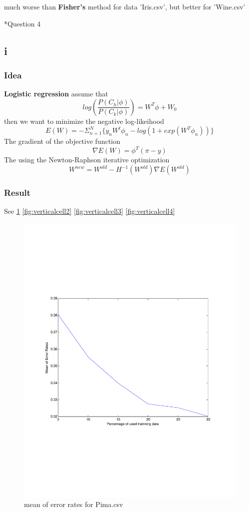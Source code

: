 \documentclass[12pt]{amsart}
\makeatletter
\renewcommand{\section}{\@startsection{section}{1}{0mm}
{-\baselineskip}{0.5\baselineskip}{\bf\leftline}}
\makeatother
\begin{document}
much worse than \textbf{Fisher's} method for data 'Iris.csv', 
but better for 'Wine.csv'




\section*{Question 4}
\subsection*{i}
\subsubsection*{Idea}
\textbf{Logistic regression} assume that
$$
	log(\frac{P(C_h|\phi)}{P(C_k|\phi)}) = W^T\phi + W_0
$$
then we want to minimize the negative log-likeihood
$$
	E(W) = -\Sigma_{n=1}^N \big \{ y_nW^t\phi_n - log(1 + exp(W^T\phi_n)) \big \}
$$
The gradient of the objective function
$$
\nabla E(W) = \phi^T (\pi - y)
$$
The using the Newton-Raphson iterative optimization
$$
W^{new} = W^{old} - H^{-1}(W^{old}) \nabla E(W^{old})
$$

\subsubsection*{Result}
See
\ref{fig:verticalcell1}
\ref{fig:verticalcell2}
\ref{fig:verticalcell3}
\ref{fig:verticalcell4}

\begin{figure}[H]
\centering
        \includegraphics[totalheight=18cm]{Pima_mean_rogReg.pdf}
    \caption{mean of error rates for Pima.csv}
    \label{fig:verticalcell1}
\end{figure}
\end{document}
